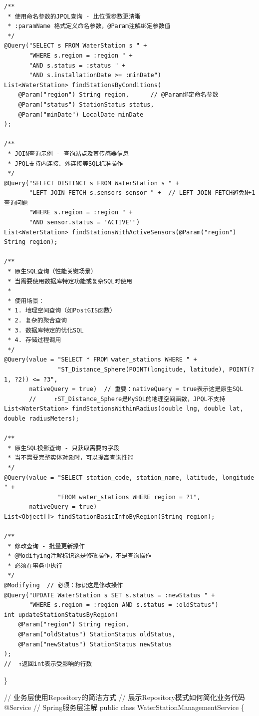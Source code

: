 \begin{verbatim}
/**
 * 使用命名参数的JPQL查询 - 比位置参数更清晰
 * :paramName 格式定义命名参数，@Param注解绑定参数值
 */
@Query("SELECT s FROM WaterStation s " +
       "WHERE s.region = :region " +
       "AND s.status = :status " +
       "AND s.installationDate >= :minDate")
List<WaterStation> findStationsByConditions(
    @Param("region") String region,      // @Param绑定命名参数
    @Param("status") StationStatus status,
    @Param("minDate") LocalDate minDate
);

/**
 * JOIN查询示例 - 查询站点及其传感器信息
 * JPQL支持内连接、外连接等SQL标准操作
 */
@Query("SELECT DISTINCT s FROM WaterStation s " +
       "LEFT JOIN FETCH s.sensors sensor " +  // LEFT JOIN FETCH避免N+1查询问题
       "WHERE s.region = :region " +
       "AND sensor.status = 'ACTIVE'")
List<WaterStation> findStationsWithActiveSensors(@Param("region") String region);

/**
 * 原生SQL查询（性能关键场景）
 * 当需要使用数据库特定功能或复杂SQL时使用
 * 
 * 使用场景：
 * 1. 地理空间查询（如PostGIS函数）
 * 2. 复杂的聚合查询
 * 3. 数据库特定的优化SQL
 * 4. 存储过程调用
 */
@Query(value = "SELECT * FROM water_stations WHERE " +
               "ST_Distance_Sphere(POINT(longitude, latitude), POINT(?1, ?2)) <= ?3",
       nativeQuery = true)  // 重要：nativeQuery = true表示这是原生SQL
       //     ↑ST_Distance_Sphere是MySQL的地理空间函数，JPQL不支持
List<WaterStation> findStationsWithinRadius(double lng, double lat, double radiusMeters);

/**
 * 原生SQL投影查询 - 只获取需要的字段
 * 当不需要完整实体对象时，可以提高查询性能
 */
@Query(value = "SELECT station_code, station_name, latitude, longitude " +
               "FROM water_stations WHERE region = ?1", 
       nativeQuery = true)
List<Object[]> findStationBasicInfoByRegion(String region);

/**
 * 修改查询 - 批量更新操作
 * @Modifying注解标识这是修改操作，不是查询操作
 * 必须在事务中执行
 */
@Modifying  // 必须：标识这是修改操作
@Query("UPDATE WaterStation s SET s.status = :newStatus " +
       "WHERE s.region = :region AND s.status = :oldStatus")
int updateStationStatusByRegion(
    @Param("region") String region,
    @Param("oldStatus") StationStatus oldStatus,
    @Param("newStatus") StationStatus newStatus
);
//  ↑返回int表示受影响的行数
\end{verbatim}

\}

// 业务层使用Repository的简洁方式 // 展示Repository模式如何简化业务代码 @Service // Spring服务层注解 public class WaterStationManagementService \{

